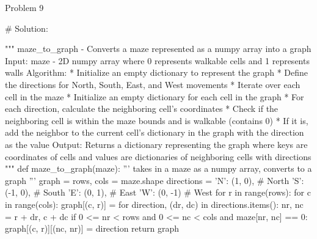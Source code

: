 \begin{problem}{Problem 9}
\begin{highlight}[Solution]
\begin{code}[Python]
    
    # Solution:
    
    """ maze_to_graph - Converts a maze represented as a numpy array into a graph
        Input:
            maze - 2D numpy array where 0 represents walkable cells and 1 represents walls
        Algorithm:
            * Initialize an empty dictionary to represent the graph
            * Define the directions for North, South, East, and West movements
            * Iterate over each cell in the maze
                * Initialize an empty dictionary for each cell in the graph
                * For each direction, calculate the neighboring cell's coordinates
                * Check if the neighboring cell is within the maze bounds and is walkable (contains 0)
                    * If it is, add the neighbor to the current cell's dictionary in the graph with the direction as the value
        Output:
            Returns a dictionary representing the graph where keys are coordinates of cells and values are dictionaries
            of neighboring cells with directions
    """
    def maze_to_graph(maze):
        ''' takes in a maze as a numpy array, converts to a graph '''
        graph = {}
        rows, cols = maze.shape
        directions = {
            'N': (1, 0),  # North
            'S': (-1, 0),   # South
            'E': (0, 1),   # East
            'W': (0, -1)   # West
        }
        for r in range(rows):
            for c in range(cols):
                graph[(c, r)] = {}
                for direction, (dr, dc) in directions.items():
                    nr, nc = r + dr, c + dc
                    if 0 <= nr < rows and 0 <= nc < cols and maze[nr, nc] == 0:
                        graph[(c, r)][(nc, nr)] = direction
        return graph
    \end{code}
    \end{highlight}
\end{problem}

